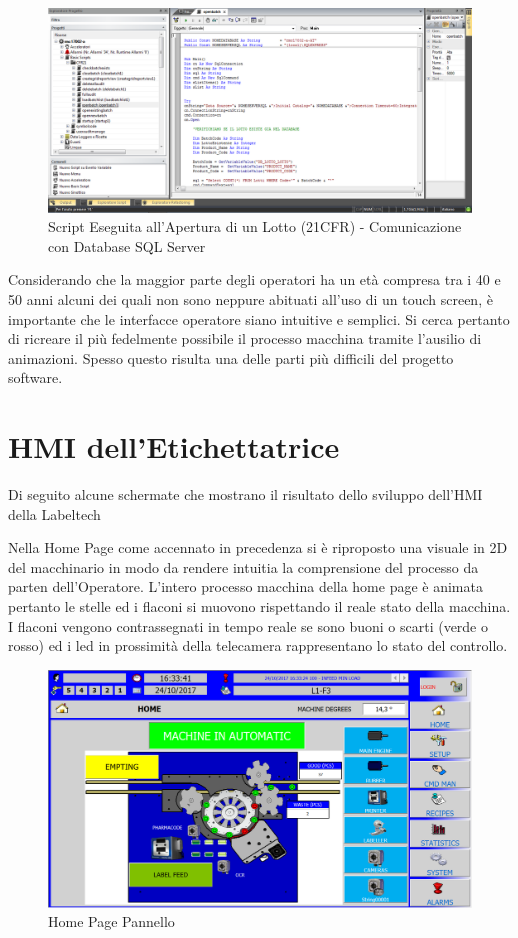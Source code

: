 \documentclass[12pt, a4paper, oneside]{book}
\begin{document}
\begin{figure}[H]
	\centering
	\includegraphics[width=13cm]{Immagini/HMI3}
	\caption{Script Eseguita all'Apertura di un Lotto (21CFR) - Comunicazione con Database SQL Server}
	\label{HMI3}
\end{figure}

Considerando che la maggior parte degli operatori ha un età compresa tra i 40 e 50 anni alcuni dei quali non sono neppure abituati all'uso di un touch screen, è importante che le interfacce operatore siano intuitive e semplici. Si cerca pertanto di ricreare il più fedelmente possibile il processo macchina tramite l'ausilio di animazioni. Spesso questo risulta una delle parti più difficili del progetto software.

\section{HMI dell'Etichettatrice}

Di seguito alcune schermate che mostrano il risultato dello sviluppo dell'HMI della Labeltech


Nella Home Page come accennato in precedenza si è riproposto una visuale in 2D del macchinario in modo da rendere intuitia la comprensione del processo da parten dell'Operatore. L'intero processo macchina della home page è animata pertanto le stelle ed i flaconi si muovono rispettando il reale stato della macchina. I flaconi vengono contrassegnati in tempo reale se sono buoni o scarti (verde o rosso) ed i led in prossimità della telecamera rappresentano lo stato del controllo.
\begin{figure}[H]
	\centering
	\includegraphics[width=13cm]{Immagini/HMI6}
	\caption{Home Page Pannello}
	\label{HMI6}
\end{figure}
\end{document}
